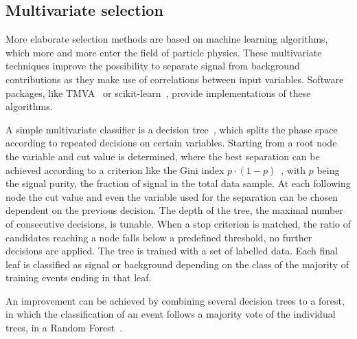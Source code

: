 
\subsection{Multivariate selection}
\label{sec:dataanalysis:selection:bdt}

More elaborate selection methods are based on machine learning algorithms,
which more and more enter the field of particle physics. These multivariate
techniques improve the possibility to separate signal from background
contributions as they make use of correlations between input variables.
Software packages, like TMVA~\cite{Hocker:2007ht} or
scikit-learn~\cite{scikit-learn}, provide implementations of these algorithms.

A simple multivariate classifier is a decision tree~\cite{Breiman}, which
splits the phase space according to repeated decisions on certain variables.
Starting from a root node the variable and cut value is determined, where the
best separation can be achieved according to a criterion like the Gini
index $p \cdot (1-p)$~\cite{giniindex}, with $p$ being the signal purity, \ie
the fraction of signal in the total data sample. At each following node the
cut value and even the variable used for the separation can be chosen
dependent on the previous decision. The depth of the tree, \ie the maximal
number of consecutive decisions, is tunable. When a stop criterion is matched,
\eg the ratio of candidates reaching a node falls below a predefined
threshold, no further decisions are applied. The tree is trained with a set of
labelled data. Each final leaf is classified as signal or background depending
on the class of the majority of training events ending in that leaf.

An improvement can be achieved by combining several decision trees to a
forest, in which the classification of an event follows a majority vote
of the individual trees, \eg in a Random Forest~\cite{RandomForest}.

